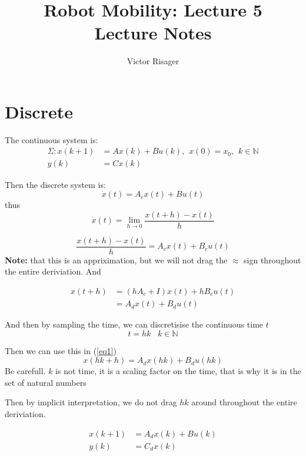 \documentclass[a4paper]{article}
\title{Robot Mobility: Lecture 5 \\
	\large Lecture Notes}
\author{Victor Risager}
\begin{document}
\maketitle

\section{Discrete}
The continuous system is:
\begin{align}
	\Sigma: x(k+1) &= A x(k) + B u(k),  \hspace{5pt}x(0) = x_0, \hspace{5pt} k \in \mathbb{N} \\ y(k) &= C x(k)
\end{align}

Then the discrete system is:
\begin{equation}
\dot{x}(t) = A_c x(t) + B u(t)
\end{equation}
thus 
\begin{equation} \label{eq3}
	\dot{x}(t) = \lim_{h \rightarrow 0} \frac{x(t+h) - x(t)}{h} 
\end{equation}

\begin{equation}
\frac{x(t+h) - x(t)}{h} = A_c x(t) + B_c u(t)
\end{equation}
\textbf{Note:} that this is an appriximation, but we will not drag the $ \approx $ sign throughout the entire deriviation. 
And

\begin{align} \label{eq1}
	x(t+h) &= (h A_c + I) x(t) + h B_c u(t)\\ &= A_d x(t) + B_d u(t)
\end{align}

And then by sampling the time, we can discretisise the continuous time $ t $
\begin{equation}
	t = h k \hspace{10pt} k \in \mathbb{N}
\end{equation}

Then we can use this in (\ref{eq1}) 
\begin{equation}
x(h k+h) = A_d x(h k) + B_d u(hk)
\end{equation}
Be carefull. $ k $ is not time, it is a scaling factor on the time, that is why it is in the set of  natural numbers

Then by implicit interpretation, we do not drag $ h k $ around throughout the entire deriviation.

\begin{align}
 x(k+1) &= A_d x(k) + B u(k) \\
 y(k) &= C_d x(k) 
\end{align}
\end{document}
